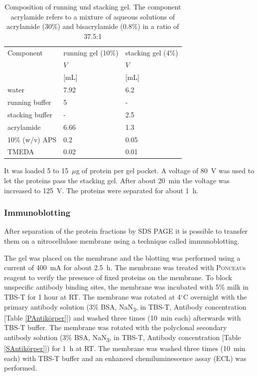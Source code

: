 \documentclass[a4paper,11pt,bibtotocnumbered]{article}
\begin{document}
\begin{table}[H]
\centering
\caption[Composition of running und stacking gel.]{Composition of running und stacking gel. The component acrylamide refers to a mixture of aqueous solutions of acrylamide (30\%) and bisacrylamide (0.8\%) in a ratio of 37.5:1}\label{SDS}
\renewcommand{\arraystretch}{1}
\begin{tabularx}{\textwidth}{p{7cm}XX}
\toprule
Component&running gel (10\%)&stacking gel (4\%)\\
&$V$&$V$ \\
& [mL]&[mL]\\ 
\midrule
water&7.92&6.2\\
running buffer &5&-\\
stacking buffer&-&2.5\\
acrylamide&6.66&1.3\\
10\% (w/v) APS&0.2&0.05\\
TMEDA&0.02&0.01\\
\bottomrule
\end{tabularx}
\end{table}
  

It was loaded 5 to 15~$\mu$g of protein per gel pocket. A voltage of 80~V was used to let the proteins pass the stacking gel. After about 20~min the voltage was increased to 125~V. The proteins were separated for about 1~h.   
  
  
\subsubsection{Immunoblotting}

After separation of the protein fractions by SDS PAGE it is possible to transfer them on a nitrocellulose membrane using a technique called immunoblotting. 

The gel was placed on the membrane and the blotting was performed using a current of 400~mA for about 2.5~h. The membrane was treated with \textsc{Ponceau}s reagent to verify the presence of fixed proteins on the membrane. To block unspecific antibody binding sites, the membrane was incubated with 5\% milk in TBS-T for 1 hour at RT. The membrane was rotated at 4$^{\circ}$C overnight with the primary antibody solution (3\% BSA, NaN\textsubscript{3}, in TBS-T, Antibody concentration [Table \ref{PAntikörper}]) and washed three times (10~min each) afterwards with TBS-T buffer. The membrane was rotated with the polyclonal secondary antibody solution (3\% BSA, NaN\textsubscript{3}, in TBS-T, Antibody concentration [Table \ref{SAntikörper}]) for 1~h at RT. The membrane was washed three times (10~min each) with TBS-T buffer and an enhanced chemiluminescence assay (ECL) was performed. 
\end{document}

